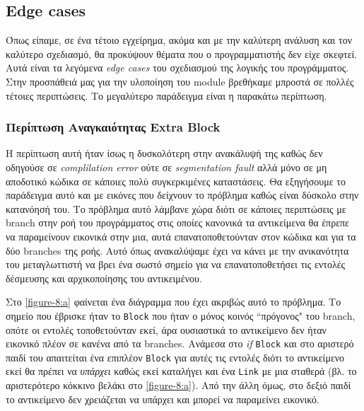 \subsection{Edge cases}

Όπως είπαμε, σε ένα τέτοιο εγχείρημα, ακόμα και με την καλύτερη ανάλυση και τον
καλύτερο σχεδιασμό, θα προκύψουν θέματα που ο προγραμματιστής δεν είχε σκεφτεί.
Αυτά είναι τα λεγόμενα \textit{edge cases} του σχεδιασμού της λογικής του
προγράμματος. Στην προσπάθειά μας για την υλοποίηση του module βρεθήκαμε μπροστά
σε πολλές τέτοιες περιπτώσεις. Το μεγαλύτερο παράδειγμα είναι η παρακάτω
περίπτωση.

\subsubsection{Περίπτωση Αναγκαιότητας Extra Block}

Η περίπτωση αυτή ήταν ίσως η δυσκολότερη στην ανακάλυψή της καθώς δεν οδηγούσε
σε \textit{complilation error} ούτε σε \textit{segmentation fault} αλλά μόνο σε
μη αποδοτικό κώδικα σε κάποιες πολύ συγκερκιμένες καταστάσεις. Θα εξηγήσουμε το
παράδειγμα αυτό και με εικόνες που δείχνουν το πρόβλημα καθώς είναι δύσκολο στην
κατανόησή του. Το πρόβλημα αυτό λάμβανε χώρα διότι σε κάποιες περιπτώσεις με
branch στην ροή του προγράμματος στις οποίες κανονικά τα αντικείμενα θα έπρεπε
να παραμείνουν εικονικά στην μια, αυτά επανατοποθετούνταν στον κώδικα και για τα
δύο branches της ροής. Αυτό όπως ανακαλύψαμε έχει να κάνει με την ανικανότητα
του μεταγλωττιστή να βρει ένα σωστό σημείο για να επανατοποθετήσει τις εντολές
δέσμευσης και αρχικοποίησης του αντικειμένου.

Στο \ref{figure-8:a} φαίνεται ένα διάγραμμα που έχει ακριβώς αυτό το πρόβλημα.
Το σημείο που έβρισκε ήταν το \texttt{Block} που ήταν ο μόνος κοινός ``πρόγονος"
του branch, οπότε οι εντολές τοποθετούνταν εκεί, άρα ουσιαστικά το αντικείμενο
δεν ήταν εικονικό πλέον σε κανένα από τα branches. Ανάμεσα στο \textit{if}
\texttt{Block} και στο αριστερό παιδί του απαιτείται ένα επιπλέον \texttt{Block}
για αυτές τις εντολές διότι το αντικείμενο εκεί θα πρέπει να \textit{υπάρχει}
καθώς εκεί καταλήγει και ένα \texttt{Link} με μια σταθερά (βλ. το αριστερότερο
κόκκινο βελάκι στο \ref{figure-8:a}). Από την άλλη όμως, στο δεξιό παιδί το
αντικείμενο δεν χρειάζεται να υπάρχει και μπορεί να παραμείνει εικονικό.

